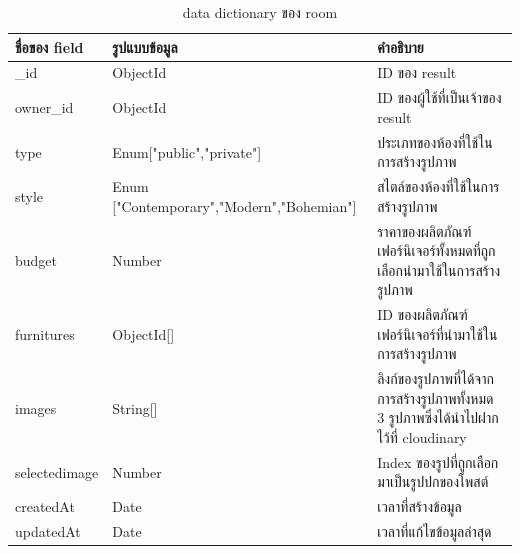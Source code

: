 \documentclass[12pt,oneside,openright,a4paper]{cpe-thai-project}
\begin{document}
\begin{table}
  \caption{data dictionary ของ room }\label{tbl:er-table2}
  \begin{tabular}{|p{2.5cm}|p{6cm}|p{6cm}|}
    \hline
    \textbf{ชื่อของ field} & \textbf{รูปแบบข้อมูล}                        & \textbf{คำอธิบาย}                                                    \\
    \hline
    \_id                 & ObjectId                                  & ID ของ result                                                      \\
    \hline
    owner\_id            & ObjectId                                  & ID ของผู้ใช้ที่เป็นเจ้าของ result                                         \\
    \hline
    type                 & Enum["public","private"]                  & ประเภทของห้องที่ใช้ในการสร้างรูปภาพ                                      \\
    \hline
    style                & Enum ["Contemporary","Modern","Bohemian"] & สไตล์ของห้องที่ใช้ในการสร้างรูปภาพ                                        \\
    \hline
    budget               & Number                                    & ราคาของผลิตภัณฑ์เฟอร์นิเจอร์ทั้งหมดที่ถูกเลือกนำมาใช้ในการสร้างรูปภาพ              \\
    \hline
    furnitures           & ObjectId[]                                & ID ของผลิตภัณฑ์เฟอร์นิเจอร์ที่นำมาใช้ในการสร้างรูปภาพ                          \\
    \hline
    images               & String[]                                  & ลิงก์ของรูปภาพที่ได้จากการสร้างรูปภาพทั้งหมด 3 รูปภาพซึ่งได้นำไปฝากไว้ที่ cloudinary \\
    \hline
    selectedimage        & Number                                    & Index ของรูปที่ถูกเลือกมาเป็นรูปปกของโพสต์                                 \\
    \hline
    createdAt            & Date                                      & เวลาที่สร้างข้อมูล                                                      \\
    \hline
    updatedAt            & Date                                      & เวลาที่แก้ไขข้อมูลล่าสุด                                                  \\
    \hline
  \end{tabular}
\end{table}
\end{document}
